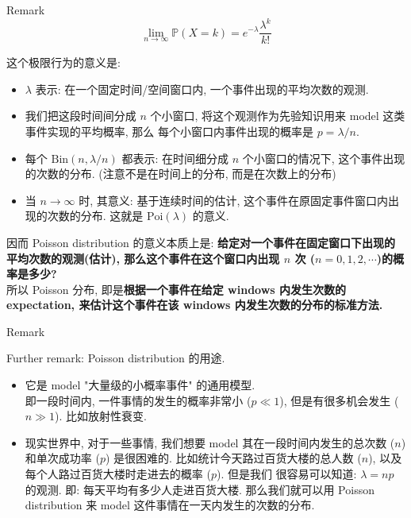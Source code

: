 \documentclass{qlnotes-export}
\begin{document}
\begin{example}
\begin{qlremark}{Remark}
\[\lim\limits_{n\rightarrow\infty}{\mathbb{P}}(X = k) = e^{- \lambda}\frac{\lambda^{k}}{k!}\]

这个极限行为的意义是:

\begin{itemize}
\item
  \(\lambda\) 表示: 在一个固定时间/空间窗口内, 一个事件出现的平均次数的观测.
\item
  我们把这段时间间分成 \(n\) 个小窗口, 将这个观测作为先验知识用来 model 这类事件实现的平均概率, 那么 每个小窗口内事件出现的概率是 \(p = \lambda/n\).
\item
  每个 \(\text{Bin}(n,\lambda/n)\) 都表示: 在时间细分成 \(n\) 个小窗口的情况下, 这个事件出现的次数的分布. (注意不是在时间上的分布, 而是在次数上的分布)
\item
  当 \(n\rightarrow\infty\) 时, 其意义: 基于连续时间的估计, 这个事件在原固定事件窗口内出现的次数的分布. 这就是 \(\text{Poi}(\lambda)\) 的意义.
\end{itemize}

因而 Poisson distribution 的意义本质上是: \textbf{给定对一个事件在固定窗口下出现的平均次数的观测(估计), 那么这个事件在这个窗口内出现 \(n\) 次 (\(n = 0,1,2,\cdots\))的概率是多少?}\\
所以 Poisson 分布, 即是\textbf{根据一个事件在给定 windows 内发生次数的 expectation, 来估计这个事件在该 windows 内发生次数的分布的标准方法.}\\

\end{qlremark}

\begin{qlremark}{Remark}

Further remark: Poisson distribution 的用途.

\begin{itemize}
\item
  它是 model "大量级的小概率事件" 的通用模型.\\
  即一段时间内, 一件事情的发生的概率非常小 (\(p \ll 1\)), 但是有很多机会发生 (\(n \gg 1\)). 比如放射性衰变.
\item
  现实世界中, 对于一些事情, 我们想要 model 其在一段时间内发生的总次数 (\(n\)) 和单次成功率 (\(p\)) 是很困难的. 比如统计今天路过百货大楼的总人数 (\(n\)), 以及每个人路过百货大楼时走进去的概率 (\(p\)). 但是我们 很容易可以知道: \(\lambda = np\) 的观测. 即: 每天平均有多少人走进百货大楼. 那么我们就可以用 Poisson distribution 来 model 这件事情在一天内发生的次数的分布.\\
\end{itemize}

\end{qlremark}

\end{example}
\end{document}
